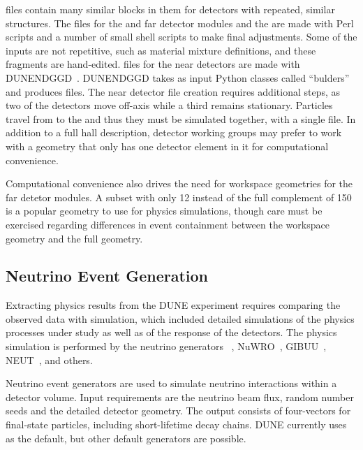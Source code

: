 \documentclass[../main-v1.tex]{subfiles}
\begin{document}
  files contain many similar blocks in them for detectors with repeated, similar structures.  The   files for the %
 and  far detector modules and the  are made with Perl scripts and a number of small shell scripts to make final adjustments.  Some of the inputs are not repetitive, such as material mixture definitions, and these fragments are hand-edited.    files for the near detectors are made with DUNENDGGD~\cite{ref:ggd}.  DUNENDGGD takes as input Python classes called ``bulders'' 
and produces   files.  The near detector   file creation requires additional steps, as two of the detectors move off-axis while a third remains stationary.  Particles travel from  to the  and thus they must be simulated together, with a single   file.  In addition to a full hall description, detector working groups may prefer to work with a geometry that only has one detector element in it for computational convenience.

Computational convenience also drives the need for workspace geometries for the far detetor modules.  A subset with only 12  instead of the full complement of 150 is a popular geometry to use for physics simulations, though care must be exercised regarding differences in event containment between the workspace geometry and the full geometry.

\subsection{Neutrino Event Generation}

Extracting physics results from the DUNE experiment requires comparing the observed data with simulation, 
which included detailed simulations 
of the physics processes under study as well as of the response of the detectors.  The physics simulation is performed by the neutrino generators ~\cite{Andreopoulos:2009rq}, NuWRO~\cite{NuWro2012}, GIBUU~\cite{Gallmeister:2016dnq}, NEUT~\cite{Hayato:2009zz}, and others. 

Neutrino event generators are used to simulate neutrino interactions within a detector volume.  Input requirements are the neutrino beam flux, random number seeds and the detailed detector geometry. The output consists of four-vectors for final-state particles, including short-lifetime decay chains.  DUNE currently uses ~\cite{GENIE} as the default, but other default generators are possible. 
\end{document}
